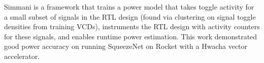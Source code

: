 \documentclass[sigconf]{acmart}
\begin{document}




Simmani\cite{simmani} is a framework that trains a power model that takes toggle activity for a small subset of signals in the RTL design (found via clustering on signal toggle densities from training VCDs), instruments the RTL design with activity counters for these signals, and enables runtime power estimation.
This work demonstrated good power accuracy on running SqueezeNet on Rocket with a Hwacha vector accelerator.



\end{document}
